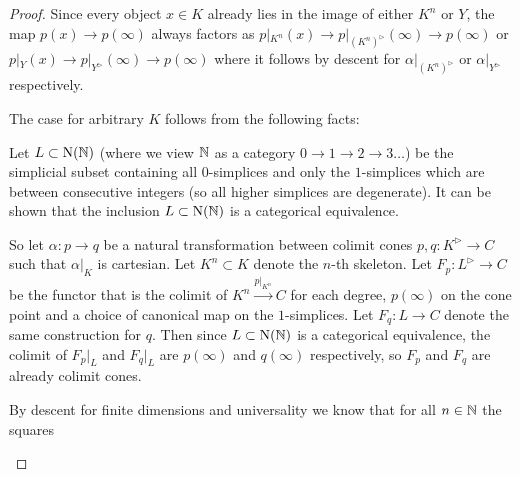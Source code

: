 \begin{lemma}
\begin{proof}
        Since every object $x\in K$ already lies in the image of either $K^n$ or $Y$, the map $p(x)\to p(\infty)$ always factors as $p|_{K^n}(x)\to p|_{\left(K^n\right)^{\rhd}}(\infty)\to p(\infty)$ or $p|_{Y}(x)\to p|_{Y^{\rhd}}(\infty)\to p(\infty)$ where it follows by descent for $\alpha|_{\left(K^n\right)^{\rhd}}$ or $\alpha|_{Y^{\rhd}}$ respectively.

        The case for arbitrary $K$ follows from the following facts:

        Let $L\subset\operatorname{N}(\mathbb{N})$ (where we view $\mathbb{N}$ as a category $0\to1\to2\to3\ldots$) be the simplicial subset containing all $0$-simplices and only the $1$-simplices which are between consecutive integers (so all higher simplices are degenerate).
        It can be shown that the inclusion $L\subset\operatorname{N}(\mathbb{N})$ is a categorical equivalence. %

        So let $\alpha\colon p\to q$ be a natural transformation between colimit cones $p,q\colon K^{\rhd}\to C$ such that $\alpha|_K$ is cartesian.
        Let $K^n\subset K$ denote the $n$-th skeleton.
        Let $F_p\colon L^{\rhd}\to C$ be the functor that is the colimit of $K^n\xrightarrow{p|_{K^n}}C$ for each degree, $p(\infty)$ on the cone point and a choice of canonical map on the $1$-simplices.
        Let $F_q\colon L\to C$ denote the same construction for $q$.
        Then since $L\subset\operatorname{N}(\mathbb{N})$ is a categorical equivalence, the colimit of $F_p|_L$ and $F_q|_L$ are $p(\infty)$ and $q(\infty)$ respectively, so $F_p$ and $F_q$ are already colimit cones.

        By descent for finite dimensions and universality we know that for all $n\in\mathbb{N}$ the squares
        \begin{center}
\end{center}
\end{proof}
\end{lemma}
